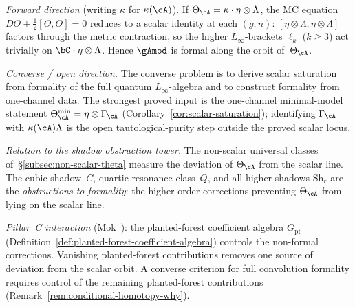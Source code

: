 \begin{remark}
\label{rem:convolution-formality-cg}
\emph{Forward direction} (writing $\kappa$ for $\kappa(\cA)$).\;
If $\Theta_{\cA} = \kappa \cdot \eta \otimes \Lambda$, the
MC equation $D \Theta + \tfrac{1}{2}[\Theta, \Theta] = 0$
reduces to a scalar identity at each $(g,n)$:
$[\eta \otimes \Lambda, \eta \otimes \Lambda]$ factors through the
metric contraction, so the higher $L_\infty$-brackets $\ell_k$
($k \geq 3$) act trivially on
$\bC \cdot \eta \otimes \Lambda$. Hence
$\gAmod$ is formal along the orbit of~$\Theta_{\cA}$.

\emph{Converse / open direction.}\;
The converse problem is to derive scalar saturation from formality of
the full quantum $L_\infty$-algebra and to construct formality from
one-channel data. The strongest proved input is the one-channel
minimal-model statement
$\Theta_{\cA}^{\min}=\eta\otimes\Gamma_{\cA}$
\textup{(}Corollary~\textup{\ref{cor:scalar-saturation}}\textup{)};
identifying $\Gamma_{\cA}$ with
$\kappa(\cA)\Lambda$ is the open tautological-purity step outside
the proved scalar locus.

\emph{Relation to the shadow obstruction tower.}\;
The non-scalar universal classes
of~\S\ref{subsec:non-scalar-theta} measure the deviation of
$\Theta_{\cA}$ from the scalar line. The cubic shadow~$C$, quartic resonance class~$Q$,
and all higher shadows $\mathrm{Sh}_r$ are the
\emph{obstructions to formality}: the higher-order
corrections preventing $\Theta_{\cA}$ from lying on the
scalar line.

\emph{Pillar~C interaction} (Mok~\cite{Mok25}):
the planted-forest coefficient algebra $G_{\mathrm{pf}}$
(Definition~\ref{def:planted-forest-coefficient-algebra}) controls
the non-formal corrections. Vanishing planted-forest
contributions removes one source of deviation from the scalar
orbit.  A converse criterion for full convolution formality requires
control of the remaining planted-forest contributions
(Remark~\ref{rem:conditional-homotopy-why}).
\end{remark}

